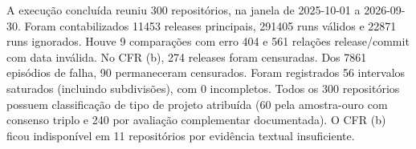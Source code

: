 A execução concluída reuniu 300 repositórios, na janela de 2025-10-01 a 2026-09-30. Foram contabilizados 11453 releases principais, 291405 runs válidos e 22871 runs ignorados. Houve 9 comparações com erro 404 e 561 relações release/commit com data inválida. No CFR (b), 274 releases foram censuradas. Dos 7861 episódios de falha, 90 permaneceram censurados. Foram registrados 56 intervalos saturados (incluindo subdivisões), com 0 incompletos. Todos os 300 repositórios possuem classificação de tipo de projeto atribuída (60 pela amostra-ouro com consenso triplo e 240 por avaliação complementar documentada). O CFR (b) ficou indisponível em 11 repositórios por evidência textual insuficiente.
